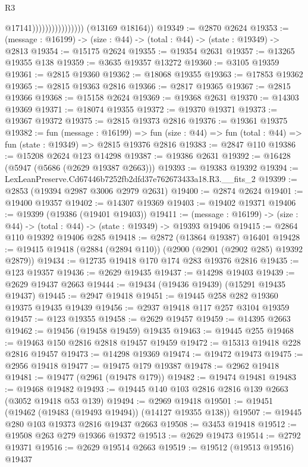 \begin{lexlean}{R3}
\begin{coremodule}
                                      @17141))))))))))))))))
      (@13169 @18164))
@19349 := @2870 @2624
@19353 := (message : @16199) -> (size : @44) -> (total : @44) -> (state : @19349) -> @2813
@19354 := @15175 @2624
@19355 := @19354 @2631
@19357 := @13265 @19355 @138
@19359 := @3635 @19357 @13272
@19360 := @3105 @19359
@19361 := @2815 @19360
@19362 := @18068 @19355
@19363 := @17853 @19362
@19365 := @2815 @19363 @2816
@19366 := @2817 @19365
@19367 := @2815 @19366
@19368 := @15158 @2624
@19369 := @19368 @2631
@19370 := @14303 @19369
@19371 := @18074 @19355
@19372 := @19370 @19371
@19373 := @19367 @19372
@19375 := @2815 @19373 @2816
@19376 := @19361 @19375
@19382 := fun (message : @16199) =>
  fun (size : @44) => fun (total : @44) => fun (state : @19349) => @2815 @19376 @2816
@19383 := @2847 @110
@19386 := @15208 @2624 @123 @14298
@19387 := @19386 @2631
@19392 := @16428 (@5947 (@5686 (@2629 @19387 @2663)))
@19393 := @19383 @19392
@19394 := LexLeanPreserve.Cd67446b7252fb2dfd37e762673433a18.R3.__fits_2
@19399 := @2853 (@19394 @2987 @3006 @2979 @2631)
@19400 := @2874 @2624
@19401 := @19400 @19357
@19402 := @14307 @19369
@19403 := @19402 @19371
@19406 := @19399 (@19386 (@19401 @19403))
@19411 := (message : @16199) -> (size : @44) -> (total : @44) -> (state : @19349) -> @19393 @19406
@19415 := @2864 @110 @19392 @19406 @285
@19418 := @2872 (@13864 @19387) @16401
@19428 := @19415 @19418 (@2884 (@2894 @110)) (@2900 (@2901 (@2902 @285) @19392 @2879))
@19434 := @12735 @19418 @170 @174 @283 @19376 @2816
@19435 := @123 @19357
@19436 := @2629 @19435
@19437 := @14298 @19403
@19439 := @2629 @19437 @2663
@19444 := @19434 (@19436 @19439) (@15291 @19435 @19437)
@19445 := @2947 @19418
@19451 := @19445 @258 @282 @19360 @19375 @19435 @19439
@19456 := @2937 @19418 @117 @257 @3104 @19359
@19457 := @123 @19355
@19458 := @2629 @19457
@19459 := @14395 @2663
@19462 := @19456 (@19458 @19459) @19435
@19463 := @19445 @255
@19468 := @19463 @150 @2816 @2818 @19457 @19459
@19472 := @15313 @19418 @228 @2816 @19457
@19473 := @14298 @19369
@19474 := @19472 @19473
@19475 := @2956 @19418
@19477 := @19475 @179 @19387
@19478 := @2962 @19418
@19481 := @19477 (@2961 (@19478 @179))
@19482 := @19474 @19481
@19483 := @19468 @19482
@19493 := @19445 @140 @103 @2816 @2816 @139 @2663 (@3052 @19418 @53 @139)
@19494 := @2969 @19418
@19501 := @19451 (@19462 (@19483 (@19493 @19494)) (@14127 @19355 @138))
@19507 := @19445 @280 @103 @19373 @2816 @19437 @2663
@19508 := @3453 @19418
@19512 := @19508 @263 @279 @19366 @19372
@19513 := @2629 @19473
@19514 := @2792 @19371
@19516 := @2629 @19514 @2663
@19519 := @19512 (@19513 @19516) @19437

\end{coremodule}
\end{lexlean}
